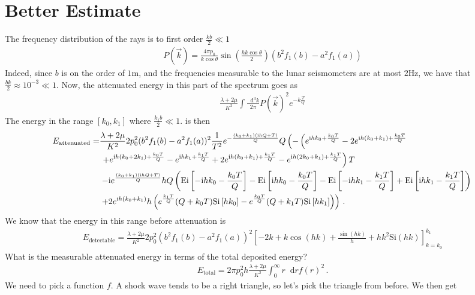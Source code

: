 \documentclass{article}
\newcommand*\diff{\mathop{}\!\mathrm{d}}
\newcommand*\te[1]{\text{#1}}
\newcommand*\p[1]{\left(#1\right)}
\newcommand*\ps[1]{\left[#1\right]}
\newcommand*\f[2]{\frac{#1}{#2}}
\newcommand*\I{\te{i}}
\begin{document}
\section{Better Estimate}
The frequency distribution of the rays is to first order $\f{kb}{2}\ll 1$
\begin{align}
P(\vec k) = \f{4\pi p_0}{k\cos\theta}\sin\p{\f{h k\cos\theta}{2}}(b^2f_1(b)-a^2f_1(a))
\end{align}
Indeed, since $b$ is on the order of $1\te{m}$, and the frequencies measurable to the lunar seismometers are at most $2\te{Hz}$, we have that $\f{bk}{2}\approx 10^{-3}\ll 1$. Now, the attenuated energy in this part of the spectrum goes as
\begin{align}
\f{\lambda+2\mu}{K^2}\int\f{\diff^3k}{2\pi}P(\vec k)^2e^{-k\f{T}{Q}}
\end{align}
The energy in the range $[k_0,k_1]$ where $\f{k_1 b}{2}\ll 1$. is then
\begin{align}
\notag E_{\te{attenuated}} =&\f{\lambda + 2\mu}{K^2}2p_0^2(b^2 f_1(b) - a^2 f_1(a))^2 \f{1}{T^2}e^{-\f{(k_0+k_1)(\I h Q+T)}{Q}} Q\p{-\p{e^{\I h k_0+\f{k_0T}{Q}} \notag -2e^{\I h(k_0+k_1)+\f{k_0 T}{Q}} \right.\right.\\&\left.\left.+ e^{\I h(k_0 + 2k_1) + \f{k_0 T}{Q}} - e^{\I h k_1 \notag + \f{k_1 T}{Q}} + 2 e^{\I h(k_0 + k_1) + \f{k_1 T}{Q}} - e^{\I h(2k_0 + k_1)+\f{k_1 T}{Q}}}T \right.\\&\left.- \I \notag e^{\f{(k_0+k_1)(\I h Q + T)}{Q}}h Q\p{\te{Ei}\ps{-\I h k_0 - \f{k_0 T}{Q}} - \te{Ei}\ps{\I h k_0 - \f{k_0 T}{Q}} - \te{Ei}\ps{-\I h k_1 - \f{k_1 T}{Q}} + \te{Ei}\ps{\I h k_1 - \f{k_1 T}{Q}}   } \right.\\&\left.+ 2e^{\I h(k_0+k_1)} h \p{e^{\f{k_1 T}{Q}}(Q + k_0 T)\te{Si}\ps{h k_0} - e^{\f{k_0 T}{Q}}(Q + k_1 T)\te{Si}\ps{h k_1}}}\,.
\end{align}
We know that the energy in this range before attenuation is
\begin{align}
E_{\te{detectable}} = \f{\lambda+2\mu}{K^2}2p_0^2(b^2f_1(b)-a^2f_1(a))^2\ps{-2k+k\cos(h k)+\f{\sin(h k)}{h}+h k^2\te{Si}(h k)}_{k=k_0}^{k_1}
\end{align}
What is the measurable attenuated energy in terms of the total deposited energy?
\begin{align}
E_{\te{total}} = 2\pi p_0^2h\f{\lambda+2\mu}{K^2}\int_0^\infty r\diff r f(r)^2\,.
\end{align}
We need to pick a function $f$. A shock wave tends to be a right triangle, so let's pick the triangle from before. We then get
\end{document}
